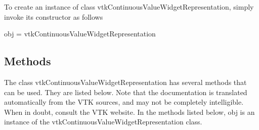 To create an instance of class vtk\-Continuous\-Value\-Widget\-Representation, simply invoke its constructor as follows \begin{DoxyVerb}  obj = vtkContinuousValueWidgetRepresentation
\end{DoxyVerb}
 \hypertarget{vtkwidgets_vtkxyplotwidget_Methods}{}\subsection{Methods}\label{vtkwidgets_vtkxyplotwidget_Methods}
The class vtk\-Continuous\-Value\-Widget\-Representation has several methods that can be used. They are listed below. Note that the documentation is translated automatically from the V\-T\-K sources, and may not be completely intelligible. When in doubt, consult the V\-T\-K website. In the methods listed below, {\ttfamily obj} is an instance of the vtk\-Continuous\-Value\-Widget\-Representation class. 
